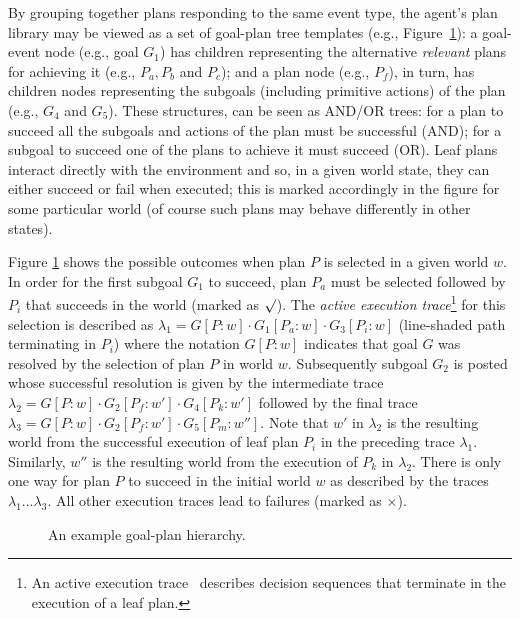 By grouping together plans responding to the same event type, the agent's plan library may be viewed as a set of goal-plan tree templates (e.g., Figure~\ref{fig:confidence}): a goal-event node (e.g., goal $G_1$) has children representing the alternative \emph{relevant} plans for achieving it (e.g., $P_a,P_b$ and $P_c$); and a plan node (e.g., $P_f$), in turn, has children nodes representing the subgoals (including primitive actions) of the plan (e.g., $G_4$ and $G_5$). These structures, can be seen as AND/OR trees: for a plan to succeed all the subgoals and actions of the plan must be successful (AND); for a subgoal to succeed one of the plans to achieve it must succeed (OR). Leaf plans interact directly with the environment and so, in a given world state, they can either succeed or fail when executed; this is marked accordingly in the figure for some particular world (of course such plans may behave differently in other states).


Figure \ref{fig:confidence} shows the possible outcomes when plan $P$ is selected in a given world $w$. In order for the first subgoal $G_1$ to succeed, plan $P_a$ must be selected followed by $P_i$ that succeeds in the world (marked as $\surd$). The {\em active execution trace}\footnote{An active execution trace~\cite{singh10:learning} describes decision sequences that terminate in the execution of a leaf plan.} for this selection is described as $\lambda_1=G[P:w] \cdot G_1[P_a:w] \cdot G_3[P_i:w]$ (line-shaded path terminating in $P_i$) where the notation $G[P:w]$ indicates that goal $G$ was resolved by the selection of plan $P$ in world $w$. Subsequently subgoal $G_2$ is posted whose successful resolution is given by the intermediate trace $\lambda_2=G[P:w] \cdot G_2[P_f:w'] \cdot G_4[P_k:w']$ followed by the final trace $\lambda_3=G[P:w] \cdot G_2[P_f:w'] \cdot G_5[P_m:w'']$. Note that $w'$ in $\lambda_2$ is the resulting world from the successful execution of leaf plan $P_i$ in the preceding trace $\lambda_1$. Similarly, $w''$ is the resulting world from the execution of $P_k$ in $\lambda_2$. There is only one way for plan $P$ to succeed in the initial world $w$ as described by the traces $\lambda_1 \ldots \lambda_3$. All other execution traces lead to failures (marked as $\times$).

\begin{figure}[t]
\begin{center}
\resizebox{0.75\columnwidth}{!}{

}
\end{center}
\vskip -0.5cm
\caption{An example goal-plan hierarchy.}
\label{fig:confidence}
\vskip -0.3cm
\end{figure}


